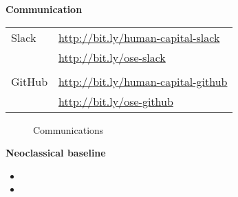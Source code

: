 \begin{frame}[c]
\begin{figure}
\end{figure}
\end{frame}
\begin{frame}
\textbf{Communication}\\\vspace{0.5cm}
\begin{tabular}{ll}
Slack     & \url{http://bit.ly/human-capital-slack} \\
          & \url{http://bit.ly/ose-slack} \\
          &                                          \\
GitHub    & \url{http://bit.ly/human-capital-github} \\
          & \url{http://bit.ly/ose-github} \\
\end{tabular}
\end{frame}
\begin{frame}
\begin{figure}[htp]\centering
\caption{Communications}
\end{figure}
\end{frame}
\begin{frame}\textbf{Neoclassical baseline}\vspace{0.5cm}

\begin{itemize}\setlength\itemsep{1em}
\item {}
\item {}
\end{itemize}

\end{frame}
